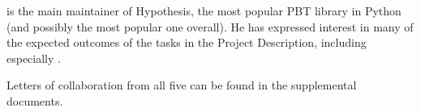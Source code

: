 \smallskip{} is the main maintainer of
Hypothesis, the most popular PBT library in Python (and possibly the most
popular one overall). He has expressed interest in many of the expected outcomes
of the tasks in the Project Description, including especially
. 

\bigskip

\noindent Letters of collaboration from all five can be found in the supplemental
documents.
